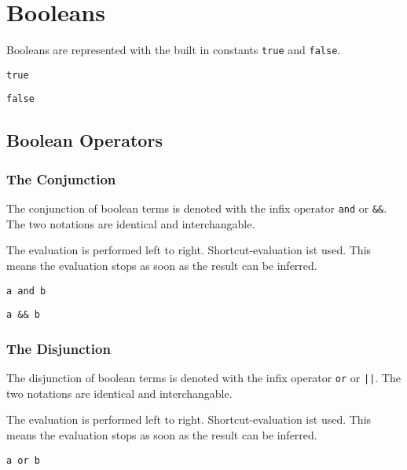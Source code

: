 \documentclass[11pt,a4paper]{scrbook}
\newcommand\keyword[1]{\texttt{#1}}
\begin{document}
\section{Booleans}

Booleans are represented with the built in constants \keyword{true} and
\keyword{false}.

\begin{lstlisting}[language=BibTool]
true
\end{lstlisting}

\begin{lstlisting}[language=BibTool]
false
\end{lstlisting}


\subsection{Boolean Operators}

\subsubsection{The Conjunction}

The conjunction of boolean terms is denoted with the infix operator
\keyword{and} or \keyword{\&\&}. The two notations are identical and
interchangable.

The evaluation is performed left to right. Shortcut-evaluation ist used. This
means the evaluation stops as soon as the result can be inferred.

\begin{lstlisting}[language=BibTool]
a and b
\end{lstlisting}

\begin{lstlisting}[language=BibTool]
a && b
\end{lstlisting}


\subsubsection{The Disjunction}

The disjunction of boolean terms is denoted with the infix operator \keyword{or}
or \keyword{||}. The two notations are identical and interchangable.

The evaluation is performed left to right. Shortcut-evaluation ist used. This
means the evaluation stops as soon as the result can be inferred.

\begin{lstlisting}[language=BibTool]
a or b
\end{lstlisting}
\end{document}
